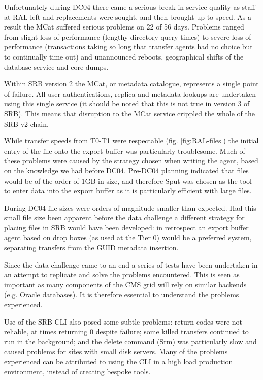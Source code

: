 \documentclass{cmspaper}
\begin{document}
Unfortunately during DC04 there came a serious break in service quality as staff at RAL left and replacements were sought, and then brought up to speed.  As a result the MCat suffered serious problems on 22 of 56 days. Problems ranged from slight loss of performance (lengthy directory query times) to severe loss of performance (transactions taking so long that transfer agents had no choice but  to continually time out) and unannounced reboots, geographical shifts of the database service and core dumps.

Within SRB version 2 the MCat, or metadata catalogue, represents a single point of failure. All user authentications, replica and metadata lookups are undertaken using this single service (it should be noted that this is not true in version 3 of SRB). This means that disruption to the MCat service crippled the whole of the SRB v2 chain.

While transfer speeds from T0-T1 were respectable (fig. \ref{fig:RAL-files}) the initial entry of the file onto the export buffer was particularly troublesome.  Much of these problems were caused by the strategy chosen when writing the agent, based on the knowledge we had before DC04. Pre-DC04 planning indicated that files would be of the order of 1GB in size, and therefore Sput was chosen as the tool to enter data into the export buffer as it is particularly efficient with large files.

During DC04 file sizes were orders of magnitude smaller than expected. Had this small file size been apparent before the data challenge a different strategy for placing files in SRB would have been developed: in retrospect an export buffer agent based on drop boxes (as used at the Tier 0) would be a preferred system, separating transfers from the GUID metadata insertion.  

Since the data challenge came to an end a series of tests have been undertaken in an attempt to replicate and solve the problems encountered. This is seen as important as many components of the CMS grid will rely on similar backends (e.g. Oracle databases). It is therefore essential to understand the problems experienced.

Use of the SRB CLI also posed some subtle problems: return codes were not reliable, at times returning 0 despite failure; some killed transfers continued to run in the background; and the delete command (Srm) was particularly slow and caused problems for sites with small disk servers. Many of the problems experienced can be attributed to using the CLI in a high load production environment, instead of creating bespoke tools. 
\end{document}
